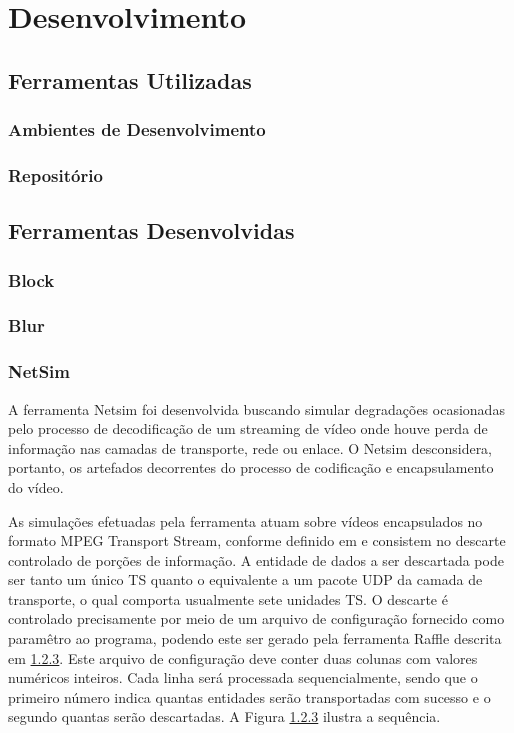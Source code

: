 
\chapter{Desenvolvimento} %

\section{Ferramentas Utilizadas}
\subsection{Ambientes de Desenvolvimento}
\subsection{Repositório}

\section{Ferramentas Desenvolvidas}
\subsection{Block}
\subsection{Blur}
\subsection{NetSim}

A ferramenta Netsim foi desenvolvida buscando simular degradações ocasionadas pelo processo de decodificação de um streaming de vídeo onde houve perda de informação nas camadas de transporte, rede ou enlace. O Netsim desconsidera, portanto, os artefados decorrentes do processo de codificação e encapsulamento do vídeo.

As simulações efetuadas pela ferramenta atuam sobre vídeos encapsulados no formato MPEG Transport Stream, conforme definido em \cite{} %
e consistem no descarte controlado de porções de informação. 
A entidade de dados a ser descartada pode ser tanto um único TS quanto o equivalente a um pacote UDP da camada de transporte, o qual comporta usualmente sete unidades TS.
O descarte é controlado precisamente por meio de um arquivo de configuração fornecido como paramêtro ao programa, podendo este ser gerado pela ferramenta Raffle descrita em \ref{}. %
Este arquivo de configuração deve conter duas colunas com valores numéricos inteiros. Cada linha será processada sequencialmente, sendo que o primeiro número indica quantas entidades serão transportadas com sucesso e o segundo quantas serão descartadas. A Figura \ref{} ilustra a sequência.

